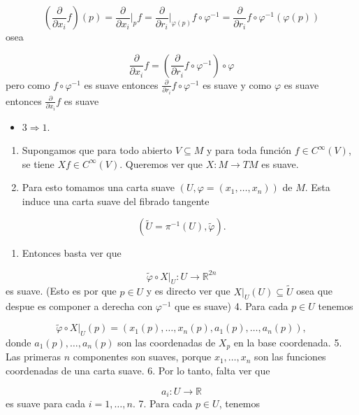 \begin{bookproof}{}
\[
\left(\frac{\partial}{\partial x_{i}}f\right)(p)=\frac{\partial}{\partial x_{i}}\bigg|_{p}f=\frac{\partial}{\partial r_{i}}\bigg|_{\varphi(p)}f\circ\varphi ^{-1}=\frac{\partial}{\partial r_{i}} f\circ\varphi ^{-1}(\varphi(p))
\]
osea

\[
\frac{\partial}{\partial x_{i}}f =\left(\frac{\partial}{\partial r_{i}}f\circ\varphi ^{-1}\right)\circ\varphi
\]
pero como $f\circ\varphi ^{-1}$ es suave entonces $\frac{\partial}{\partial r_{i}}f\circ\varphi ^{-1}$ es suave y como $\varphi$ es suave entonces $\frac{\partial}{\partial x_{i}}f$ es suave

\begin{itemize}
\item $3 \Rightarrow 1$.
\end{itemize}
\begin{enumerate}
\item Supongamos que para todo abierto $V\subseteq M$ y para toda función $f\in C^\infty(V)$, se tiene $Xf\in C^\infty(V)$. Queremos ver que $X:M\to TM$ es suave.
\item Para esto tomamos una carta suave $(U,\varphi=(x_1,\ldots,x_n))$ de $M$. Esta induce una carta suave del fibrado tangente
\end{enumerate}
\[
(\widetilde U=\pi^{-1}(U),\widetilde\varphi).
\]
\begin{enumerate}[start=3]
\item Entonces basta ver que
\end{enumerate}
\[
\widetilde\varphi\circ X|_U:U\to\mathbb R^{2n}
\]
es suave. (Esto es por que $p\in U$ y es directo ver que $X|_{U}(U)\subseteq \tilde{U}$ osea que despue es componer a derecha con $\varphi ^{-1}$ que es suave) 4. Para cada $p\in U$ tenemos

\[
\widetilde\varphi\circ X|_U(p)=\left(x_1(p),\ldots,x_n(p),a_1(p),\ldots,a_n(p)\right),
\]
donde $a_1(p),\ldots,a_n(p)$ son las coordenadas de $X_p$ en la base coordenada. 5. Las primeras $n$ componentes son suaves, porque $x_1,\ldots,x_n$ son las funciones coordenadas de una carta suave. 6. Por lo tanto, falta ver que

\[
a_i:U\to\mathbb R
\]
es suave para cada $i=1,\ldots,n$. 7. Para cada $p\in U$, tenemos


\end{bookproof}
